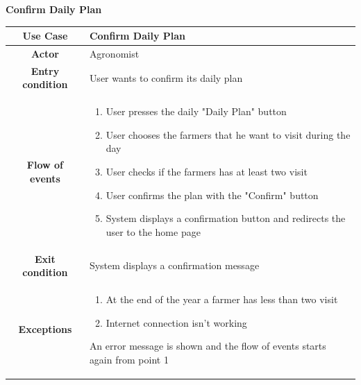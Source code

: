 \documentclass[table, 12pt]{article}
\begin{document}
\begin{itemize}
            \begin{table}[H]
                \item[] \textbf{Confirm Daily Plan}
                \item[] 
                \centering
                \begin{tabular}{|c| m{}|}
                    \hline
                    \textbf{Use Case} & Confirm Daily Plan\\ \hline
                    \textbf{Actor} & Agronomist\\ \hline
                    \textbf{Entry condition} & User wants to confirm its daily plan\\  \hline
                    \textbf{Flow of events} & \begin{enumerate}
                                                \item User presses the daily "Daily Plan" button
                                                \item User chooses the farmers that he want to visit during the day
                                                \item User checks if the farmers has at least two visit
                                                \item User confirms the plan with the "Confirm" button
                                                \item System displays a confirmation button and redirects the user to the home page
                                            \end{enumerate}\\ \hline
                    \textbf{Exit condition} & System displays a confirmation message\\ \hline
                    \textbf{Exceptions} &  \begin{enumerate}
                        \item At the end of the year a farmer has less than two visit
                        \item Internet connection isn't working
                    \end{enumerate}
                    An error message is shown and the flow of events starts again from point 1\\ \hline                    
                \end{tabular}
            \end{table}


\end{itemize}
\end{document}
